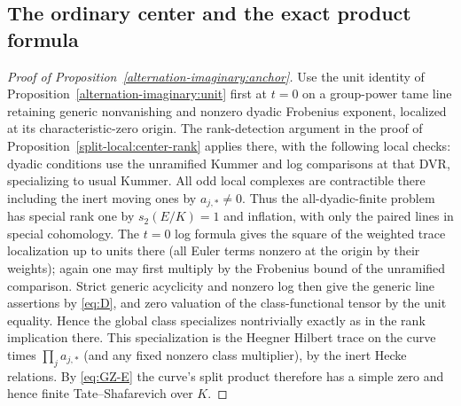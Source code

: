 \subsection{The ordinary center and the exact product formula}

\begin{proof}[Proof of Proposition~\ref{alternation-imaginary:anchor}]

Use the unit identity of Proposition~\ref{alternation-imaginary:unit} first at \(t=0\) on a group-power tame line retaining generic nonvanishing and nonzero dyadic Frobenius exponent, localized at its characteristic-zero origin. The rank-detection argument in the proof of Proposition~\ref{split-local:center-rank} applies there, with the following local checks: dyadic conditions use the unramified Kummer and log comparisons at that DVR, specializing to usual Kummer. All odd local complexes are contractible there including the inert moving ones by \(a_{j,*}\ne0\). Thus the all-dyadic-finite problem has special rank one by \(s_2(E/K)=1\) and inflation, with only the paired lines in special cohomology. The \(t=0\) log formula gives the square of the weighted trace localization up to units there (all Euler terms nonzero at the origin by their weights); again one may first multiply by the Frobenius bound of the unramified comparison. Strict generic acyclicity and nonzero log then give the generic line assertions by \eqref{eq:D}, and zero valuation of the class-functional tensor by the unit equality. Hence the global class specializes nontrivially exactly as in the rank implication there. This specialization is the Heegner Hilbert trace on the curve times \(\prod_j a_{j,*}\) (and any fixed nonzero class multiplier), by the inert Hecke relations. By \eqref{eq:GZ-E} the curve's split product therefore has a simple zero and hence finite Tate--Shafarevich over \(K\).


\end{proof}
